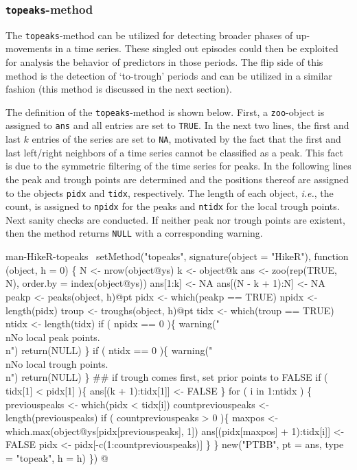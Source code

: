 \documentclass[a4paper]{article}
\begin{document}
\subsubsection{\texttt{topeaks}-method}
The \verb?topeaks?-method can be utilized for detecting broader phases of
up-movements in a time series. These singled out episodes could then
be exploited for analysis the behavior of predictors in those
periods. The flip side of this method is the detection of `to-trough'
periods and can be utilized in a similar fashion (this method is
discussed in the next section).\par
The definition of the \verb?topeaks?-method is shown below. First, a
\verb?zoo?-object is assigned to \verb?ans? and all entries are set to
\verb?TRUE?. In the next two lines, the first and last $k$ entries of the
series are set to \verb?NA?, motivated by the fact that the first and
last left/right neighbors of a time series cannot be classified as a
peak. This fact is due to the symmetric filtering of the time series
for peaks. In the following lines the peak and trough points are
determined and the positions thereof are assigned to the objects
\verb?pidx? and \verb?tidx?, respectively. The length of each object,
\emph{i.e.}, the count, is assigned to \verb?npidx? for the peaks and
\verb?ntidx? for the local trough points. Next sanity checks are
conducted. If neither peak nor trough points are existent, then the
method returns \verb?NULL? with a corresponding warning.

\nwenddocs{}\endmoddef
\LA{}man-HikeR-topeaks~{\nwtagstyle{}}\RA{}
setMethod("topeaks",
    signature(object = "HikeR"),
    function (object, h = 0) \{
        N <- nrow(object@ys)
        k <- object@k
        ans <- zoo(rep(TRUE, N), order.by = index(object@ys))
        ans[1:k] <- NA
        ans[(N - k + 1):N] <- NA
        peakp <- peaks(object, h)@pt
        pidx <- which(peakp == TRUE)
        npidx <- length(pidx)
        troup <- troughs(object, h)@pt
        tidx <- which(troup == TRUE)
        ntidx <- length(tidx)
        if ( npidx == 0 )\{
            warning("\\nNo local peak points.\\n")
            return(NULL)
        \}
        if ( ntidx == 0 )\{
            warning("\\nNo local trough points.\\n")
            return(NULL)
        \}
        ## if trough comes first, set prior points to FALSE
        if ( tidx[1] < pidx[1] )\{
            ans[(k + 1):tidx[1]] <- FALSE
        \}
        for ( i in 1:ntidx ) \{
            previouspeaks <- which(pidx < tidx[i])
            countpreviouspeaks <- length(previouspeaks)
            if ( countpreviouspeaks > 0 )\{
                maxpos <- which.max(object@ys[pidx[previouspeaks], 1])
                ans[(pidx[maxpos] + 1):tidx[i]] <- FALSE
                pidx <- pidx[-c(1:countpreviouspeaks)]
            \}
        \}
        new("PTBB", pt = ans, type = "topeak", h = h)
\})
\nwendcode{}@
\end{document}
